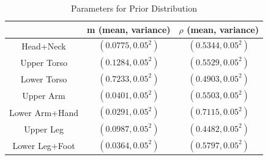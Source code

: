 \begin{table}
\caption{Parameters for Prior Distribution}
\label{table:prior}
\begin{center}
\begin{tabular}{|c|c|c|}
\hline
           & m (mean, variance) & $\rho$ (mean, variance) \\
\hline
 Head+Neck & $(0.0775, 0.05^2)$ & $(0.5344, 0.05^2)$ \\
\hline
 Upper Torso & $(0.1284, 0.05^2)$ & $(0.5529, 0.05^2) $\\
\hline
 Lower Torso & $(0.7233, 0.05^2)$ & $(0.4903, 0.05^2) $\\
\hline
 Upper Arm & $(0.0401, 0.05^2)$ & $(0.5503, 0.05^2)$ \\
\hline
 Lower Arm+Hand & $(0.0291, 0.05^2)$ & $(0.7115, 0.05^2)$ \\
\hline
 Upper Leg & $(0.0987, 0.05^2)$ & $(0.4482, 0.05^2) $\\
\hline
 Lower Leg+Foot & $(0.0364, 0.05^2)$ & $(0.5797, 0.05^2)$ \\
\hline
\end{tabular}
\end{center}
\end{table}


